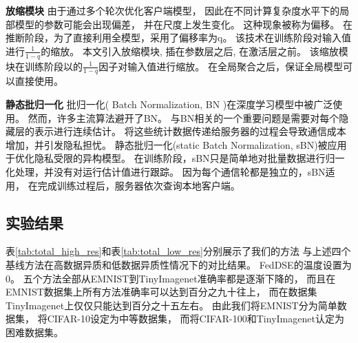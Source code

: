 \textbf{放缩模块 }
由于通过多个轮次优化客户端模型，
因此在不同计算复杂度水平下的局部模型的参数可能会出现偏差，
并在尺度上发生变化。
这种现象被称为偏移\cite{srivastava2014dropout}。
在推断阶段，为了直接利用全模型，采用了偏移率为q。
该技术在训练阶段对输入值进行$\frac{1}{1-q}$的缩放。
本文引入放缩模块,
插在参数层之后,
在激活层之前。
该缩放模块在训练阶段以的$\frac{1}{1-q}$因子对输入值进行缩放。
在全局聚合之后，保证全局模型可以直接使用。

\textbf{静态批归一化 }
批归一化\cite{NEURIPS2018_36072923,andreux2020siloed}( Batch Normalization, BN )在深度学习模型中被广泛使用。
然而，许多主流算法避开了BN。
与BN相关的一个重要问题是需要对每个隐藏层的表示进行连续估计。
将这些统计数据传递给服务器的过程会导致通信成本增加，并引发隐私担忧。
静态批归一化(static Batch Normalization, sBN)被应用于优化隐私受限的异构模型。
在训练阶段，sBN只是简单地对批量数据进行归一化处理，并没有对运行估计值进行跟踪。
因为每个通信轮都是独立的，sBN适用，
在完成训练过程后，服务器依次查询本地客户端。

\subsection{实验结果}
表\ref{tab:total_high_res}和表\ref{tab:total_low_res}分别展示了我们的方法
与上述四个基线方法在高数据异质和低数据异质性情况下的对比结果。
FedDSE的温度设置为0。
五个方法全部从EMNIST到TinyImagenet准确率都是逐渐下降的，
而且在EMNIST数据集上所有方法准确率可以达到百分之九十往上，
而在数据集TinyImagenet上仅仅只能达到百分之十五左右。
由此我们将EMNIST分为简单数据集，
将CIFAR-10设定为中等数据集，
而将CIFAR-100和TinyImagenet认定为困难数据集。

